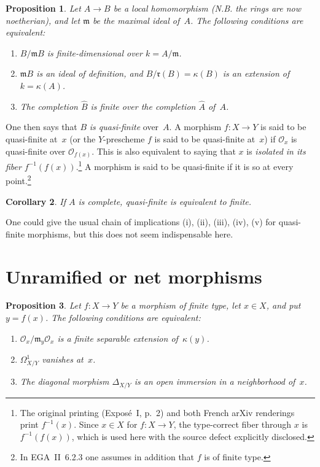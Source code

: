 \documentclass[11pt,oneside]{amsbook}
\newtheorem{proposition}{Proposition}[section]
\newtheorem{corollary}[proposition]{Corollary}
\begin{document}
\begin{proposition}
\label{I.2.1}
Let \(A\to B\) be a local homomorphism (N.B. the rings are now
noetherian), and let \(\mathfrak m\) be the maximal ideal of~\(A\).  The
following conditions are equivalent:
\begin{enumerate}
\item[(i)] \(B/\mathfrak mB\) is finite-dimensional over
  \(k=A/\mathfrak m\).
\item[(ii)] \(\mathfrak mB\) is an ideal of definition, and
  \(B/\mathfrak r(B)=\kappa(B)\) is an extension of
  \(k=\kappa(A)\).
\item[(iii)] The completion \(\widehat B\) is finite over the completion
  \(\widehat A\) of~\(A\).
\end{enumerate}
\end{proposition}

One then says that
\(B\) \emph{is quasi-finite} over~\(A\).  A morphism
\(f\colon X\to Y\) is said to be quasi-finite at~\(x\) (or the
\(Y\)-prescheme \(f\) is said to be quasi-finite at~\(x\)) if
\(\mathcal O_x\) is quasi-finite over \(\mathcal O_{f(x)}\).  This is also
equivalent to saying that \(x\) is \emph{isolated in its fiber}
\(f^{-1}(f(x))\).\footnote{The original printing (Exposé~I, p.~2) and both
French arXiv renderings print \(f^{-1}(x)\).  Since \(x\in X\) for
\(f\colon X\to Y\), the type-correct fiber through \(x\) is
\(f^{-1}(f(x))\), which is used here with the source defect explicitly
disclosed.} A morphism is said to be quasi-finite if it is so at
every point.\footnote{In EGA~II~6.2.3 one assumes in addition that \(f\) is
of finite type.}

\begin{corollary}
\label{I.2.2}
If \(A\) is complete, quasi-finite is equivalent to finite.
\end{corollary}

One could give the usual chain of implications \textup{(i), (ii), (iii),
(iv), (v)} for quasi-finite morphisms, but this does not seem indispensable
here.


\section{Unramified or net morphisms}
\label{I.3}

\begin{proposition}
\label{I.3.1}
Let \(f\colon X\to Y\) be a morphism of finite type, let \(x\in X\), and
put \(y=f(x)\).  The following conditions are equivalent:
\begin{enumerate}
\item[(i)] 
  \(\mathcal O_x/\mathfrak m_y\mathcal O_x\) is a finite separable
  extension of~\(\kappa(y)\).
\item[(ii)] \(\Omega^1_{X/Y}\) vanishes at~\(x\).
\item[(iii)] The diagonal morphism \(\Delta_{X/Y}\) is an open immersion
  in a neighborhood of~\(x\).
\end{enumerate}
\end{proposition}
\end{document}
